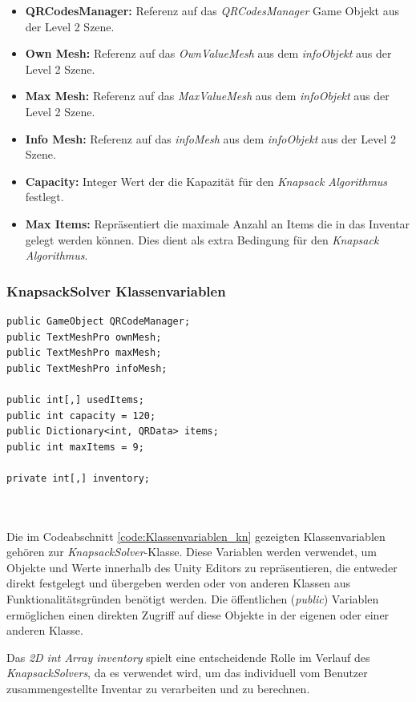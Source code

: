 \begin{itemize}
\item \textbf{QRCodesManager:} Referenz auf das \textit{QRCodesManager} Game Objekt aus der Level 2 Szene.
\item \textbf{Own Mesh:} Referenz auf das \textit{OwnValueMesh} aus dem \textit{infoObjekt} aus der Level 2 Szene.
\item \textbf{Max Mesh:} Referenz auf das \textit{MaxValueMesh} aus dem \textit{infoObjekt} aus der Level 2 Szene.
\item \textbf{Info Mesh:} Referenz auf das \textit{infoMesh} aus dem \textit{infoObjekt} aus der Level 2 Szene.
\item \textbf{Capacity:} Integer Wert der die Kapazität für den \textit{Knapsack Algorithmus} festlegt.
\item \textbf{Max Items:} Repräsentiert die maximale Anzahl an Items die in das Inventar gelegt werden können. Dies
dient als extra Bedingung für den \textit{Knapsack Algorithmus}.\\
\end{itemize}

\subsubsection{KnapsackSolver Klassenvariablen}
\begin{lstlisting}[style=csharp, caption={Klassenvariablen des KnapsackSolvers}, label=code:Klassenvariablen_kn]
public GameObject QRCodeManager;
public TextMeshPro ownMesh;
public TextMeshPro maxMesh;
public TextMeshPro infoMesh;

public int[,] usedItems;
public int capacity = 120;
public Dictionary<int, QRData> items;
public int maxItems = 9;

private int[,] inventory;
\end{lstlisting}\\
\\
Die im Codeabschnitt \ref{code:Klassenvariablen_kn} gezeigten Klassenvariablen gehören zur \textit{KnapsackSolver}-Klasse.
Diese Variablen werden verwendet, um Objekte und Werte innerhalb des Unity Editors zu repräsentieren, die entweder direkt
festgelegt und übergeben werden oder von anderen Klassen aus Funktionalitätsgründen benötigt werden. Die öffentlichen
(\textit{public}) Variablen ermöglichen einen direkten Zugriff auf diese Objekte in der eigenen oder einer anderen Klasse.

Das \textit{2D int Array inventory} spielt eine entscheidende Rolle im Verlauf des \textit{KnapsackSolvers}, da es verwendet
wird, um das individuell vom Benutzer zusammengestellte Inventar zu verarbeiten und zu berechnen.

